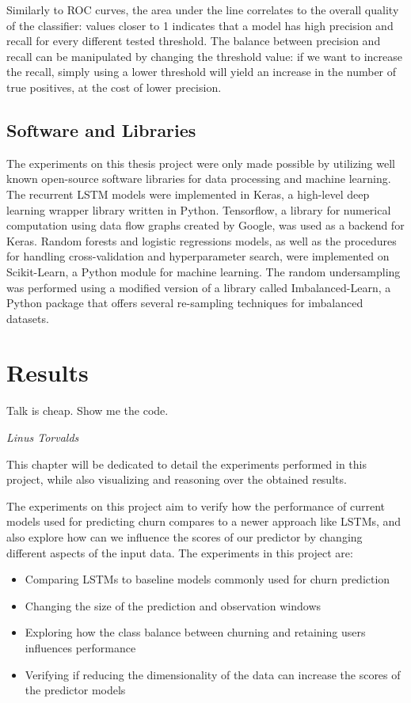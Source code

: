 \documentclass{kththesis}
\begin{document}
Similarly to ROC curves, the area under the line correlates to the overall quality of the classifier: values closer to 1 indicates that a model has high precision and recall for every different tested threshold.  The balance between precision and recall can be manipulated by changing the threshold value: if we want to increase the recall, simply using a lower threshold will yield an increase in the number of true positives, at the cost of lower precision.

\section{Software and Libraries}

The experiments on this thesis project were only made possible by utilizing well known open-source software libraries for data processing and machine learning. The recurrent LSTM models were implemented in Keras\citep{chollet2015keras}, a high-level deep learning wrapper library written in Python.  Tensorflow\citep{abadi2016tensorflow}, a library for numerical computation using data flow graphs created by Google, was used as a backend for Keras. Random forests and logistic regressions models, as well as  the procedures for handling cross-validation and hyperparameter search, were implemented on Scikit-Learn\citep{scikit-learn}, a Python module for machine learning. The random undersampling was performed using a modified version of a library called Imbalanced-Learn\citep{lema2017imbalanced}, a Python package that offers several re-sampling techniques for imbalanced datasets. 

\chapter{Results}
\label{cha:results}

\epigraph{Talk is cheap. Show me the code.}{\textit{Linus Torvalds}}

This chapter will be dedicated to detail the experiments performed in this project, while also visualizing and reasoning over the obtained results.

The experiments on this project aim to verify how the performance of current models used for predicting churn compares to a newer approach like LSTMs, and also explore how can we influence the scores of our predictor by changing different aspects of the input data. The experiments in this project are:

\begin{itemize}
\item Comparing LSTMs to baseline models commonly used for churn prediction
\item Changing the size of the prediction and observation windows
\item Exploring how the class balance between churning and retaining users influences performance
\item Verifying if reducing the dimensionality of the data can increase the scores of the predictor models 
\end{itemize}
\end{document}
